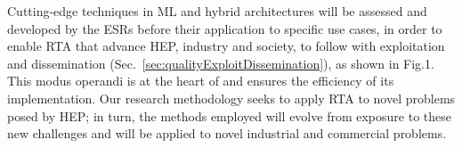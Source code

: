 
Cutting-edge techniques in ML and hybrid architectures will be assessed and developed by the ESRs before their application to specific use cases, in order to enable RTA that advance HEP, industry and society, to follow with exploitation and dissemination (Sec.~\ref{sec:qualityExploitDissemination}), as shown in Fig.1. 
This modus operandi is at the heart of \acronym and ensures the efficiency of its implementation. 
Our research methodology seeks to apply RTA to novel problems posed by HEP; in turn, the methods employed will evolve from exposure to these new challenges and will be applied to novel industrial and commercial problems.


%


